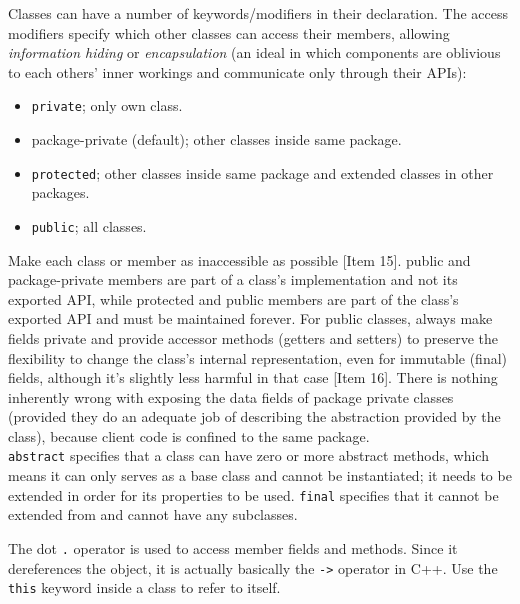 \documentclass[8pt, table, xcdraw]{article}%
\begin{document}
Classes can have a number of keywords/modifiers in their declaration. The access modifiers specify which other classes can access their members, allowing \emph{information hiding} or \emph{encapsulation} (an ideal in which components are oblivious to each others’ inner workings and communicate only through their APIs):

\begin{itemize}
    \item \lstinline{private}; only own class.
    \item package-private (default); other classes inside same package.
    \item \lstinline{protected}; other classes inside same package and extended classes in other packages.
    \item \lstinline{public}; all classes.
\end{itemize}

Make each class or member as inaccessible as possible [Item 15]. public and package-private members are part of a class's implementation and not its exported API, while protected and public members are part of the class's exported API and must be maintained forever. For public classes, always make fields private and provide accessor methods (getters and setters) to preserve the flexibility to change the class's internal representation, even for immutable (final) fields, although it's slightly less harmful in that case [Item 16]. There is nothing inherently wrong with exposing the data fields of package private classes (provided they do an adequate job of describing the abstraction provided by the class), because client code is confined to the same package.\\
\lstinline{abstract} specifies that a class can have zero or more abstract methods, which means it can only serves as a base class and cannot be instantiated; it needs to be extended in order for its properties to be used. \lstinline{final} specifies that it cannot be extended from and cannot have any subclasses.

The dot \lstinline{.} operator is used to access member fields and methods. Since it dereferences the object, it is actually basically the \lstinline{->} operator in C++. Use the \lstinline{this} keyword inside a class to refer to itself.
\end{document}
